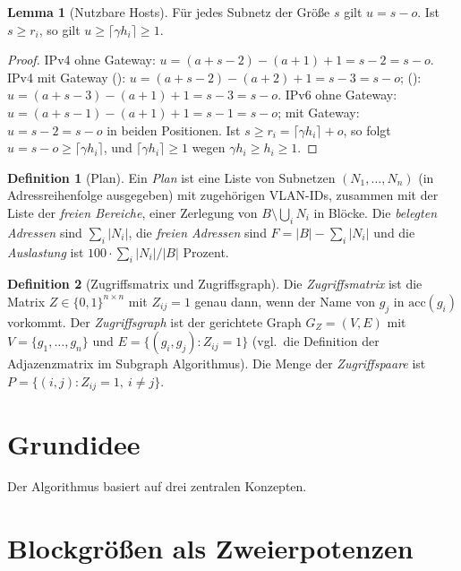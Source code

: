 \documentclass[a4paper,12pt, twoside]{report}
\theoremstyle{definition}
\newtheorem{definition}{Definition}
\newtheorem{lemma}{Lemma}
\newcommand{\code}[1]{\texttt{\detokenize{#1}}}
\begin{document}
\begin{lemma}[Nutzbare Hosts]
\label{lem:usable}
	Für jedes Subnetz der Größe $s$ gilt $u = s - o$. Ist $s \ge r_i$, so gilt $u \ge \lceil \gamma h_i \rceil \ge 1$.
\end{lemma}

\begin{proof}
	IPv4 ohne Gateway: $u = (a+s-2) - (a+1) + 1 = s - 2 = s - o$. IPv4 mit Gateway (\code{first}): $u = (a+s-2) - (a+2) + 1 = s-3 = s - o$; (\code{last}): $u = (a+s-3) - (a+1) + 1 = s - 3 = s-o$. IPv6 ohne Gateway: $u = (a+s-1) - (a+1) + 1 = s-1 = s-o$; mit Gateway: $u = s-2 = s-o$ in beiden Positionen. Ist $s \ge r_i = \lceil\gamma h_i\rceil + o$, so folgt $u = s - o \ge \lceil\gamma h_i\rceil$, und $\lceil \gamma h_i \rceil \ge 1$ wegen $\gamma h_i \ge h_i \ge 1$.
\end{proof}

\begin{definition}[Plan]
	Ein \emph{Plan} ist eine Liste von Subnetzen $(N_1,\ldots,N_n)$ (in Adressreihenfolge ausgegeben) mit zugehörigen VLAN-IDs, zusammen mit der Liste der \emph{freien Bereiche}, einer Zerlegung von $B \setminus \bigcup_i N_i$ in Blöcke. Die \emph{belegten Adressen} sind $\sum_i |N_i|$, die \emph{freien Adressen} sind $F = |B| - \sum_i |N_i|$ und die \emph{Auslastung} ist $100 \cdot \sum_i |N_i| / |B|$ Prozent.
\end{definition}

\begin{definition}[Zugriffsmatrix und Zugriffsgraph]
\label{def:zugriff}
	Die \emph{Zugriffsmatrix} ist die Matrix $Z \in \{0,1\}^{n\times n}$ mit $Z_{ij} = 1$ genau dann, wenn der Name von $g_j$ in $\text{acc}(g_i)$ vorkommt. Der \emph{Zugriffsgraph} ist der gerichtete Graph $G_Z = (V,E)$ mit $V = \{g_1,\ldots,g_n\}$ und $E = \{(g_i,g_j) : Z_{ij} = 1\}$ (vgl.\ die Definition der Adjazenzmatrix im Subgraph Algorithmus). Die Menge der \emph{Zugriffspaare} ist $P = \{(i,j) : Z_{ij} = 1,\ i \neq j\}$.
\end{definition}

\section{Grundidee}

Der Algorithmus basiert auf drei zentralen Konzepten.

\section{Blockgrößen als Zweierpotenzen}
\end{document}
